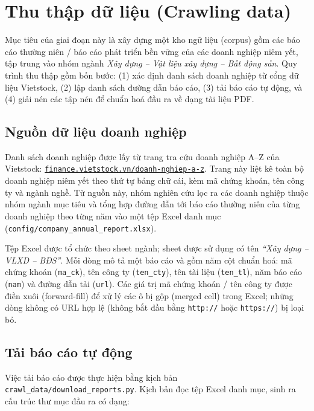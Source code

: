 \documentclass{article}
\begin{document}
\section{Thu thập dữ liệu (Crawling data)}

Mục tiêu của giai đoạn này là xây dựng một kho ngữ liệu (corpus) gồm các báo cáo
thường niên / báo cáo phát triển bền vững của các doanh nghiệp niêm yết, tập
trung vào nhóm ngành \textit{Xây dựng -- Vật liệu xây dựng -- Bất động sản}. Quy
trình thu thập gồm bốn bước: (1) xác định danh sách doanh nghiệp từ cổng dữ liệu
Vietstock, (2) lập danh sách đường dẫn báo cáo, (3) tải báo cáo tự động, và (4)
giải nén các tập nén để chuẩn hoá đầu ra về dạng tài liệu PDF.

\subsection{Nguồn dữ liệu doanh nghiệp}

Danh sách doanh nghiệp được lấy từ trang tra cứu doanh nghiệp A--Z của Vietstock:
\href{https://finance.vietstock.vn/doanh-nghiep-a-z?page=1}{\texttt{finance.vietstock.vn/doanh-nghiep-a-z}}.
Trang này liệt kê toàn bộ doanh nghiệp niêm yết theo thứ tự bảng chữ cái, kèm mã
chứng khoán, tên công ty và ngành nghề. Từ nguồn này, nhóm nghiên cứu lọc ra các
doanh nghiệp thuộc nhóm ngành mục tiêu và tổng hợp đường dẫn tới báo cáo thường
niên của từng doanh nghiệp theo từng năm vào một tệp Excel danh mục
(\texttt{config/company\_annual\_report.xlsx}).

Tệp Excel được tổ chức theo sheet ngành; sheet được sử dụng có tên
\textit{``Xây dựng -- VLXD -- BĐS''}. Mỗi dòng mô tả một báo cáo và gồm năm cột
chuẩn hoá: mã chứng khoán (\texttt{ma\_ck}), tên công ty (\texttt{ten\_cty}),
tên tài liệu (\texttt{ten\_tl}), năm báo cáo (\texttt{nam}) và đường dẫn tải
(\texttt{url}). Các giá trị mã chứng khoán / tên công ty được điền xuôi
(forward-fill) để xử lý các ô bị gộp (merged cell) trong Excel; những dòng không
có URL hợp lệ (không bắt đầu bằng \texttt{http://} hoặc \texttt{https://}) bị loại bỏ.

\subsection{Tải báo cáo tự động}

Việc tải báo cáo được thực hiện bằng kịch bản
\texttt{crawl\_data/download\_reports.py}. Kịch bản đọc tệp Excel danh mục, sinh
ra cấu trúc thư mục đầu ra có dạng:
\end{document}
